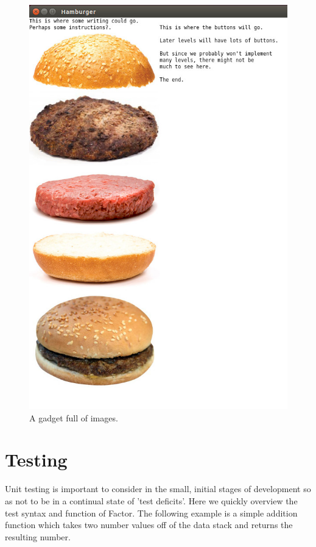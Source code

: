 \documentclass{sig-alternate}
\begin{document}
\begin{figure}[h!]
  \centering
    \includegraphics[scale=.35]{image-gadget.jpg}
  \caption{A gadget full of images.}
\end{figure}


\section{Testing}
Unit testing is important to consider in the small, initial stages of development so as not to be in a continual state of 'test deficits'. Here we quickly overview the test syntax and function of Factor. The following example is a simple addition function which takes two number values off of the data stack and returns the resulting number.
\end{document}
